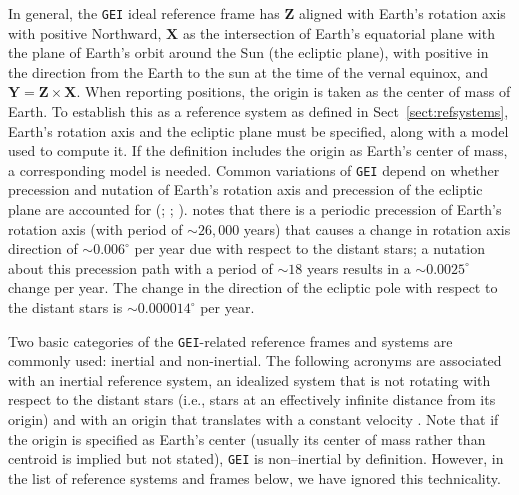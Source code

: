 \documentclass[draft]{agujournal2019}
\begin{document}
In general, the \texttt{GEI} ideal reference frame has $\mathbf{Z}$ aligned with Earth's rotation axis with positive Northward, $\mathbf{X}$ as the intersection of Earth's equatorial plane with the plane of Earth's orbit around the Sun (the ecliptic plane), with positive in the direction from the Earth to the sun at the time of the vernal equinox, and $\mathbf{Y}=\mathbf{Z}\times\mathbf{X}$. When reporting positions, the origin is taken as the center of mass of Earth. To establish this as a reference system as defined in Sect~\ref{sect:refsystems}, Earth's rotation axis and the ecliptic plane must be specified, along with a model used to compute it. If the definition includes the origin as Earth's center of mass, a corresponding model is needed. Common variations of \texttt{GEI} depend on whether precession and nutation of Earth's rotation axis and precession of the ecliptic plane are accounted for (; ; ).  notes that there is a periodic precession of Earth's rotation axis (with period of ${\sim}26,000$ years) that causes a change in rotation axis direction of ${\sim}0.006^\circ$ per year due with respect to the distant stars; a nutation about this precession path with a period of ${\sim}18$ years results in a 
${\sim}0.0025^\circ$ change per year. The change in the direction of the ecliptic pole with respect to the distant stars is $\sim 0.000014^\circ$ per year.

Two basic categories of the \texttt{GEI}-related reference frames and systems are commonly used: inertial and non-inertial. The following acronyms are associated with an inertial reference system, an idealized system that is not rotating with respect to the distant stars (i.e., stars at an effectively infinite distance from its origin) and with an origin that translates with a constant velocity \cite{NAIFOverview2023}. Note that if the origin is specified as Earth's center (usually its center of mass rather than centroid is implied but not stated), \texttt{GEI} is non--inertial by definition. However, in the list of reference systems and frames below, we have ignored this technicality.

\end{document}
